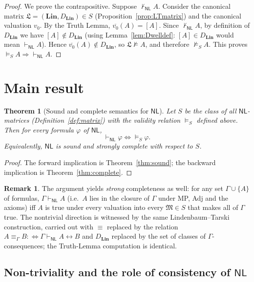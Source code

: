 \documentclass[12pt]{article}
\newtheorem{theorem}{Theorem}
\theoremstyle{definition}
\newtheorem{remark}{Remark}
\newcommand{\NL}{\mathsf{NL}}
\newcommand{\prv}{\vdash_{\NL}}
\newcommand{\vld}{\vDash}
\newcommand{\bic}{\leftrightarrow}
\newcommand{\Lin}{\mathbf{Lin}}
\begin{document}
\begin{proof}
We prove the contrapositive. Suppose $\not\prv A$. Consider the canonical
matrix $\mathfrak L=(\Lin,D_{\Lin})\in S$ (Proposition~\ref{prop:LTmatrix}) and
the canonical valuation $v_{0}$. By the Truth Lemma,
$\overline{v_{0}}(A)=[A]$. Since $\not\prv A$, by definition of $D_{\Lin}$ we
have $[A]\notin D_{\Lin}$ (using Lemma~\ref{lem:Dwelldef}: $[A]\in D_{\Lin}$
would mean $\prv A$). Hence $\overline{v_{0}}(A)\notin D_{\Lin}$, so
$\mathfrak L\not\vld A$, and therefore $\not\vld_{S}A$. This proves
$\vld_{S}A\Rightarrow\prv A$.
\end{proof}

\section{Main result}

\begin{theorem}[Sound and complete semantics for $\NL$]\label{thm:main}
Let $S$ be the class of all $\NL$-matrices (Definition~\ref{def:matrix}) with the
validity relation $\vld_{S}$ defined above. Then for every formula $\varphi$ of
$\NL$,
\[
\prv\varphi \iff \vld_{S}\varphi .
\]
Equivalently, $\NL$ is sound and strongly complete with respect to $S$.
\end{theorem}

\begin{proof}
The forward implication is Theorem~\ref{thm:sound}; the backward implication is
Theorem~\ref{thm:complete}.
\end{proof}

\begin{remark}\label{rem:strongcompl}
The argument yields \emph{strong} completeness as well: for any set
$\Gamma\cup\{A\}$ of formulas, $\Gamma\prv A$ (i.e.\ $A$ lies in the closure of
$\Gamma$ under MP, Adj and the axioms) iff $A$ is true under every valuation into
every $\mathfrak M\in S$ that makes all of $\Gamma$ true. The nontrivial
direction is witnessed by the same Lindenbaum--Tarski construction, carried out
with $\equiv$ replaced by the relation $A\equiv_\Gamma B:\Leftrightarrow
\Gamma\prv A\bic B$ and $D_{\Lin}$ replaced by the set of classes of
$\Gamma$-consequences; the Truth-Lemma computation is identical.
\end{remark}

\subsection*{Non-triviality and the role of consistency of $\NL$}
\end{document}
